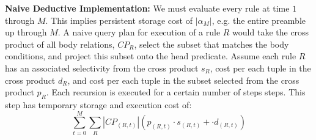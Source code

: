 



%
%
{\bf Naive Deductive Implementation: } We must evaluate every rule at time $1$
through $M$.  This implies persistent storage cost of $|\alpha_M|$, e.g. the
entire preamble up through $M$.
A naive query plan for execution of a rule $R$ would take the cross product of
all body relations, $CP_R$, select the subset that matches the body conditions,
and project this subset onto the head predicate.  Assume each rule $R$ has an
associated selectivity from the cross product $s_R$, cost per each tuple in the
cross product $d_R$, and cost per each tuple in the subset selected from the
cross product $p_R$.  Each recursion is executed for a certain number of steps
steps.  This step has temporary storage and execution cost of:
%
\[ \sum_{t=0}^M \sum_{R} |CP_{(R,t)}|(p_{(R,t)} \cdot s_{(R,t)} + \cdot
d_{(R,t)}) \]
%

